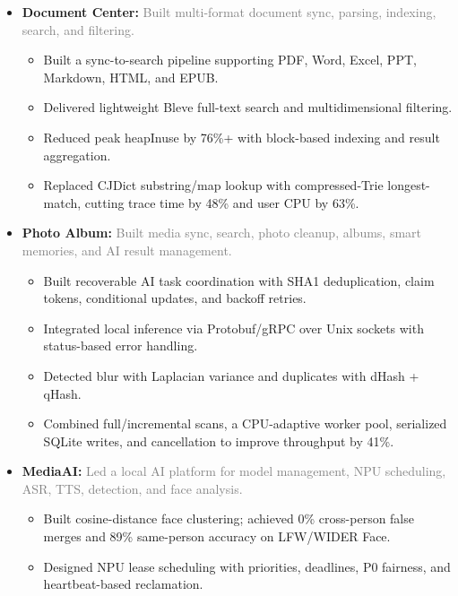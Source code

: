 \documentclass{resume}
\begin{document}
\begin{itemize}

    \item \textbf{Document Center:}
    {\small
    \noindent\textcolor{gray}{Built multi-format document sync, parsing, indexing, search, and filtering.}
    }
    \vspace{0.2ex}
    \begin{itemize}
        \item Built a sync-to-search pipeline supporting PDF, Word, Excel, PPT, Markdown, HTML, and EPUB.
        \item Delivered lightweight Bleve full-text search and multidimensional filtering.
        \item Reduced peak heapInuse by 76\%+ with block-based indexing and result aggregation.
        \item Replaced CJDict substring/map lookup with compressed-Trie longest-match, cutting trace time by 48\% and user CPU by 63\%.
    \end{itemize}
    \vspace{1ex}

    \item \textbf{Photo Album:}
    {\small
    \noindent\textcolor{gray}{Built media sync, search, photo cleanup, albums, smart memories, and AI result management.}
    }
    \vspace{0.2ex}
    \begin{itemize}
        \item Built recoverable AI task coordination with SHA1 deduplication, claim tokens, conditional updates, and backoff retries.
        \item Integrated local inference via Protobuf/gRPC over Unix sockets with status-based error handling.
        \item Detected blur with Laplacian variance and duplicates with dHash + qHash.
        \item Combined full/incremental scans, a CPU-adaptive worker pool, serialized SQLite writes, and cancellation to improve throughput by 41\%.
    \end{itemize}
    \vspace{1ex}

    \item \textbf{MediaAI:}
    {\small
    \noindent\textcolor{gray}{Led a local AI platform for model management, NPU scheduling, ASR, TTS, detection, and face analysis.}
    }
    \vspace{0.2ex}
    \begin{itemize}
        \item Built cosine-distance face clustering; achieved 0\% cross-person false merges and 89\% same-person accuracy on LFW/WIDER Face.
        \item Designed NPU lease scheduling with priorities, deadlines, P0 fairness, and heartbeat-based reclamation.
    \end{itemize}
    \vspace{1ex}


\end{itemize}
\end{document}
